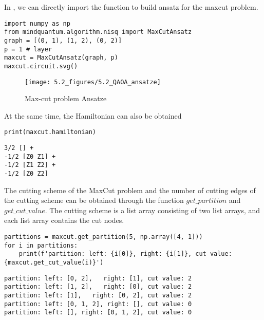 In \MindQuantum, we can directly import the function \MaxCutAnsatz to build ansatz for the maxcut problem.
\begin{lstlisting}
import numpy as np
from mindquantum.algorithm.nisq import MaxCutAnsatz
graph = [(0, 1), (1, 2), (0, 2)]
p = 1 # layer
maxcut = MaxCutAnsatz(graph, p)
maxcut.circuit.svg()
\end{lstlisting}
\begin{figure}[H]
    \centering
    \texttt{[image: 5.2\_figures/5.2\_QAOA\_ansatze]}
    \caption{Max-cut problem Ansatze}
    \label{5.1_QAOA_ansatz}
\end{figure}
At the same time, the Hamiltonian can also be obtained
\begin{lstlisting}
print(maxcut.hamiltonian)
\end{lstlisting}
\begin{lstlisting}
3/2 [] +
-1/2 [Z0 Z1] +
-1/2 [Z1 Z2] +
-1/2 [Z0 Z2]
\end{lstlisting}
The cutting scheme of the MaxCut problem and the number of cutting edges of the cutting scheme can be obtained through the function $get\_partition$ and $get\_cut\_value$. The cutting scheme is a list array consisting of two list arrays, and each list array contains the cut nodes.
\begin{lstlisting}
partitions = maxcut.get_partition(5, np.array([4, 1]))
for i in partitions:
    print(f'partition: left: {i[0]}, right: {i[1]}, cut value: {maxcut.get_cut_value(i)}')
\end{lstlisting}
\begin{lstlisting}
partition: left: [0, 2],   right: [1], cut value: 2
partition: left: [1, 2],   right: [0], cut value: 2
partition: left: [1],   right: [0, 2], cut value: 2
partition: left: [0, 1, 2], right: [], cut value: 0
partition: left: [], right: [0, 1, 2], cut value: 0
\end{lstlisting}











